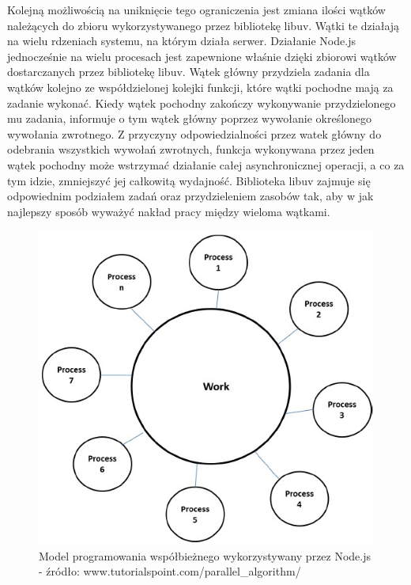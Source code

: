 \documentclass[12pt]{report}
\begin{document}
Kolejną możliwością na uniknięcie tego ograniczenia jest zmiana ilości wątków należących do zbioru wykorzystywanego przez bibliotekę libuv. 
Wątki te działają na wielu rdzeniach systemu, na którym działa serwer. 
Działanie Node.js jednocześnie na wielu procesach jest zapewnione właśnie dzięki zbiorowi wątków dostarczanych przez bibliotekę libuv.
Wątek główny przydziela zadania dla wątków kolejno ze współdzielonej kolejki funkcji, które wątki pochodne mają za zadanie wykonać. 
Kiedy wątek pochodny zakończy wykonywanie przydzielonego mu zadania, informuje o tym wątek główny poprzez wywołanie określonego wywołania zwrotnego. 
Z przyczyny odpowiedzialności przez watek główny do odebrania wszystkich wywołań zwrotnych, funkcja wykonywana przez jeden wątek pochodny może wstrzymać działanie całej asynchronicznej operacji, a co za tym idzie, zmniejszyć jej całkowitą wydajność. 
Biblioteka libuv zajmuje się odpowiednim podziałem zadań oraz przydzieleniem zasobów tak, aby w jak najlepszy sposób wyważyć nakład pracy między wieloma wątkami. 
\newpage
\begin{figure}[!hb]
\centering
\includegraphics[width=\textwidth,height=\textheight,keepaspectratio]{thread.png} 
\caption{Model programowania współbieżnego wykorzystywany przez Node.js - źródło: www.tutorialspoint.com/parallel\_algorithm/}
\end{figure}
\end{document}
